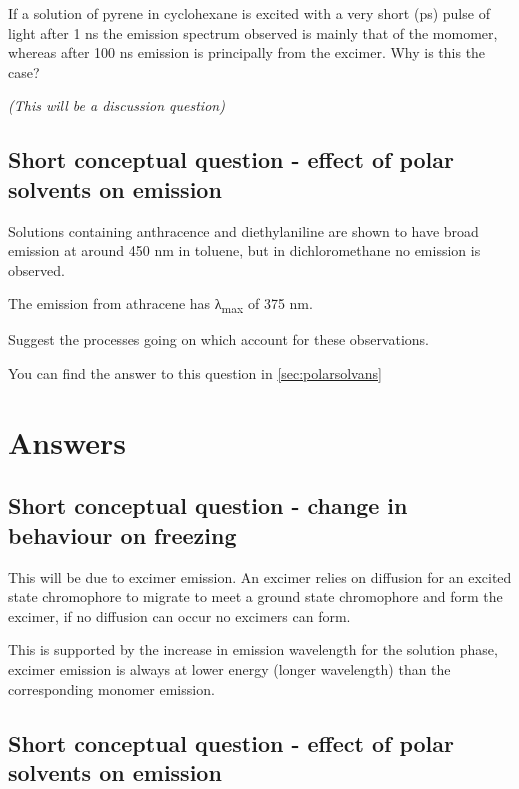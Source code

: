 \documentclass[
]{book}
\begin{document}
If a solution of pyrene in cyclohexane is excited with a very short (ps) pulse of light after 1 ns the emission spectrum observed is mainly that of the momomer, whereas after 100 ns emission is principally from the excimer. Why is this the case?

\emph{(This will be a discussion question)}

\hypertarget{sec:polarsolv}{%
\subsection{Short conceptual question - effect of polar solvents on emission}\label{sec:polarsolv}}

Solutions containing anthracence and diethylaniline are shown to have broad emission at around 450 nm in toluene, but in dichloromethane no emission is observed.

The emission from athracene has λ\textsubscript{max} of 375 nm.

Suggest the processes going on which account for these observations.

You can find the answer to this question in \ref{sec:polarsolvans}

\hypertarget{answers-2}{%
\section{Answers}\label{answers-2}}

\hypertarget{short-conceptual-question---change-in-behaviour-on-freezing-1}{%
\subsection{Short conceptual question - change in behaviour on freezing}\label{short-conceptual-question---change-in-behaviour-on-freezing-1}}

This will be due to excimer emission. An excimer relies on diffusion for an excited state chromophore to migrate to meet a ground state chromophore and form the excimer, if no diffusion can occur no excimers can form.

This is supported by the increase in emission wavelength for the solution phase, excimer emission is always at lower energy (longer wavelength) than the corresponding monomer emission.

\hypertarget{short-conceptual-question---effect-of-polar-solvents-on-emission}{%
\subsection{Short conceptual question - effect of polar solvents on emission}\label{short-conceptual-question---effect-of-polar-solvents-on-emission}}
\end{document}
